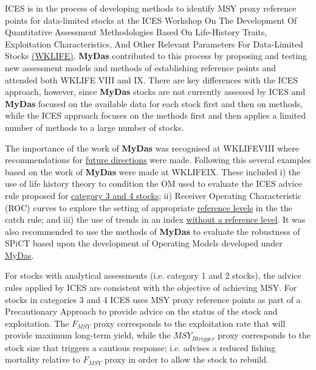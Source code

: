 ICES is in the process of developing methods to identify MSY proxy reference points for data-limited stocks at the ICES Workshop On The Development Of Quantitative Assessment Methodologies Based On Life-History Traits, Exploitation Characteristics, And Other Relevant Parameters For Data-Limited Stocks \href{http://ices.dk/sites/pub/Publication Reports/Expert Group Report/Fisheries Resources Steering Group/2019/WKLIFEIX/WKLIFE_IX_2019.pdf}{(WKLIFE)}. \textbf{MyDas} contributed to this process by proposing and testing new assessment models and methods of establishing reference points and attended both WKLIFE VIII and IX. There are key differences with the ICES approach, however, since \textbf{MyDas} stocks are not currently assessed by ICES and \textbf{MyDas} focused on the available data for each stock first and then on methods, while the ICES approach focuses on the methods first and then applies a limited number of methods to a large number of stocks. 

The importance of the work of \textbf{MyDas} was recognised at WKLIFEVIII where recommendations for \href{http://ices.dk/sites/pub/Publication Reports/Expert Group Report/acom/2018/WKLIFEVIII/WKLIFEVIII_2018.pdf#page=42}{future directions} were made. Following this several examples based on the work of \textbf{MyDas} were made at WKLIFEIX. These included i) the use of life history theory to condition the OM used to evaluate the ICES advice rule proposed for \href{http://ices.dk/sites/pub/Publication Reports/Expert Group Report/Fisheries Resources Steering Group/2019/WKLIFEIX/WKLIFE_IX_2019.pdf#page=30}{category 3 and 4 stocks}; ii) Receiver Operating Characteristic (ROC) curves to explore the setting of appropriate 
\href{http://ices.dk/sites/pub/Publication Reports/Expert Group Report/Fisheries Resources Steering Group/2019/WKLIFEIX/WKLIFE_IX_2019.pdf#page=58}{reference levels} in the the catch rule; and iii) the use of trends in an index \href{http://ices.dk/sites/pub/Publication Reports/Expert Group Report/Fisheries Resources Steering Group/2019/WKLIFEIX/WKLIFE_IX_2019.pdf#page=64}{without a reference level}. It was also recommended to use the methods of \textbf{MyDas} to evaluate the robustness of SPiCT based upon the development of Operating Models developed under \href{http://ices.dk/sites/pub/Publication Reports/Expert Group Report/Fisheries Resources Steering Group/2019/WKLIFEIX/WKLIFE_IX_2019.pdf#page=138}{MyDas}.

For stocks with analytical assessments (i.e. category 1 and 2 stocks), the advice rules applied by ICES are consistent with the objective of achieving MSY. For stocks in categories 3 and 4 ICES uses MSY proxy reference points as part of a Precautionary Approach to provide advice on the status of the stock and exploitation. The $F_{MSY}$ proxy corresponds to the exploitation rate that will provide maximum long-term yield, while the $MSY_{Btrigger}$ proxy corresponds to the stock size that triggers a cautious response; i.e. advises a reduced fishing mortality relative to $F_{MSY}$ proxy in order to allow the stock to rebuild. 

